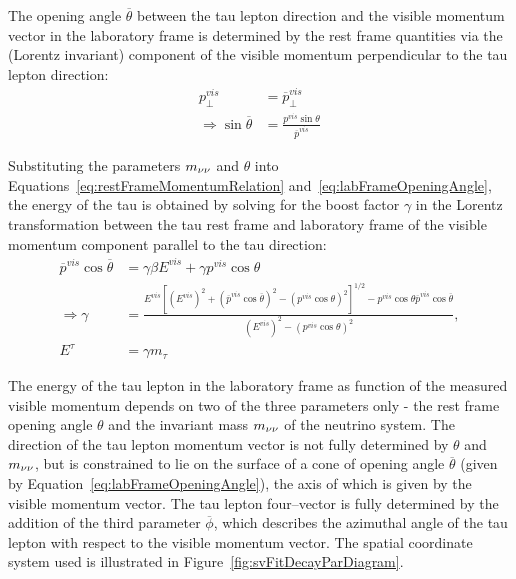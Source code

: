 The opening angle $\overline{\theta}$ between the tau lepton direction and the
visible momentum vector in the laboratory frame is determined by the rest frame
quantities via the (Lorentz invariant) component of the visible momentum
perpendicular to the tau lepton direction:
\begin{align}
p^{vis}_{\perp} &= \overline p^{vis}_{\perp} \nonumber \\
\Rightarrow \sin \overline \theta &= \frac{p^{vis} \sin \theta}{\overline p^{vis}} 
\label{eq:labFrameOpeningAngle} 
\end{align}

Substituting the parameters $m_{\nu\nu}$ and $\theta$ into
Equations~\ref{eq:restFrameMomentumRelation} and~\ref{eq:labFrameOpeningAngle},
the energy of the tau is obtained by solving for the boost factor $\gamma$ in
the Lorentz transformation between the tau rest frame and laboratory frame of the
visible momentum component parallel to the tau direction:
\begin{align}
\overline{p}^{vis} \cos \overline{\theta} &= \gamma \beta E^{vis} + \gamma p^{vis} \cos\theta \nonumber \\ 
\Rightarrow \gamma &= \frac{E^{vis}[{\left( E^{vis} \right)^2 + \left( \overline{p}^{vis} \cos \overline{\theta} \right)^2 
 - \left( p^{vis} \cos \theta \right)^2}]^{1/2} - p^{vis} \cos \theta \overline{p}^{vis} \cos \overline{\theta}}{\left( E^{vis} \right)^2 
 - \left( p^{vis} \cos \theta \right)^2}, \nonumber \\
E^{\tau} &= \gamma m_\tau \nonumber
\end{align}

The energy of the tau lepton in the laboratory frame as function of the measured
visible momentum depends on two of the three parameters only - the rest frame
opening angle $\theta$ and the invariant mass $m_{\nu\nu}$ of the neutrino system.
The direction of the tau lepton momentum vector is not fully determined by
$\theta$ and $m_{\nu\nu}$, but is constrained to lie on the surface of a cone of
opening angle $\overline{\theta}$ (given by Equation~\ref{eq:labFrameOpeningAngle}),
the axis of which is given by the visible momentum vector.  The tau lepton
four--vector is fully determined by the addition of the third parameter
$\overline{\phi}$, which describes the azimuthal angle of the tau lepton with respect
to the visible momentum vector.  The spatial coordinate system used is
illustrated in Figure~\ref{fig:svFitDecayParDiagram}.


